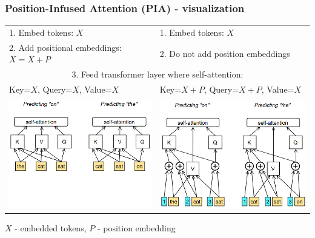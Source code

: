 \documentclass{beamer}
\begin{document}
\begin{frame}
    \frametitle{Position-Infused Attention (PIA) - visualization}
    \begin{center}
        \begin{tabular}{ l l }
        \scriptsize{1. Embed tokens: $ X $} & \scriptsize{1. Embed tokens: $ X $}
        \\
        \scriptsize{2. Add positional embeddings: $ X = X + P $} & \scriptsize{2. Do not add position embeddings}
        \\
        \multicolumn{2}{c}{\scriptsize{3. Feed transformer layer where self-attention:}}
        \\
        \scriptsize{ Key=$X$, Query=$X$, Value=$X$ } & \scriptsize{ Key=$X + P$, Query=$X + P$, Value=$X$ }
        \\
        \includegraphics[scale=0.30]{img/shortformer_attention_base.png}
        & \includegraphics[scale=0.30]{img/shortformer_attention_cached.png} \\
        \end{tabular}
    \end{center}
    \begin{center}
        \scriptsize{$X$ - embedded tokens, $P$ - position embedding}
    \end{center}
\end{frame}
\end{document}
